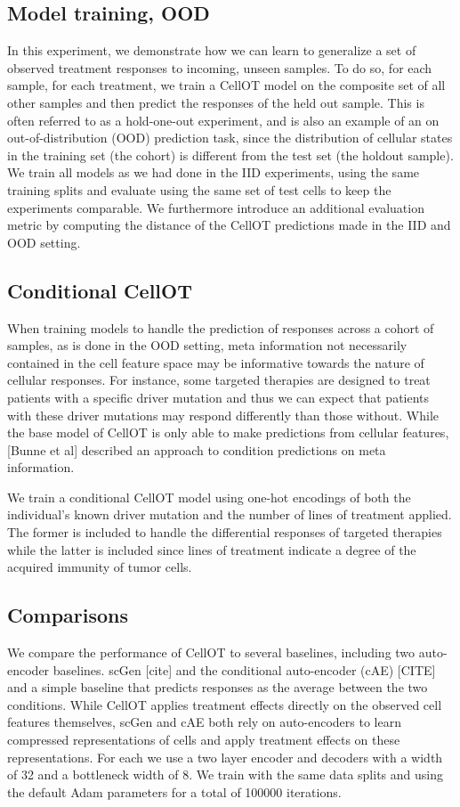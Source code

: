 \subsection{Model training, OOD}
In this experiment, we demonstrate how we can learn to generalize a set of observed treatment responses to incoming, unseen samples. To do so,  for each sample, for each treatment, we train a CellOT model on the composite set of all other samples and then predict the responses of the held out sample. This is often referred to as a hold-one-out experiment, and is also an example of an on out-of-distribution (OOD) prediction task, since the distribution of cellular states in the training set (the cohort) is different from the test set (the holdout sample). We train all models as we had done in the IID experiments, using the same training splits and evaluate using the same set of test cells to keep the experiments comparable.  We furthermore introduce an additional evaluation metric by computing the distance of the CellOT predictions made in the IID and OOD setting.

\subsection{Conditional CellOT}
When training models to handle the prediction of responses across a cohort of samples, as is done in the OOD setting, meta information not necessarily contained in the cell feature space may be informative towards the nature of cellular responses. For instance, some targeted therapies are designed to treat patients with a specific driver mutation and thus we can expect that patients with these driver mutations may respond differently than those without. While the base model of CellOT is only able to make predictions from cellular features, [Bunne et al] described an approach to condition predictions on meta information.

We train a conditional CellOT model using one-hot encodings of both the individual’s known driver mutation and the number of lines of treatment applied. The former is included to handle the differential responses of targeted therapies while the latter is included since lines of treatment indicate a degree of the acquired immunity of tumor cells.

\subsection{Comparisons}
We compare the performance of CellOT to several baselines, including two auto-encoder baselines. scGen [cite] and the conditional auto-encoder (cAE) [CITE] and a simple baseline that predicts responses as the average between the two conditions. While CellOT applies treatment effects directly on the observed cell features themselves, scGen and cAE both rely on auto-encoders to learn compressed representations of cells and apply treatment effects on these representations. For each we use a two layer encoder and decoders with a width of 32 and a bottleneck width of 8. We train with the same data splits and using the default Adam parameters for a total of 100000 iterations.
